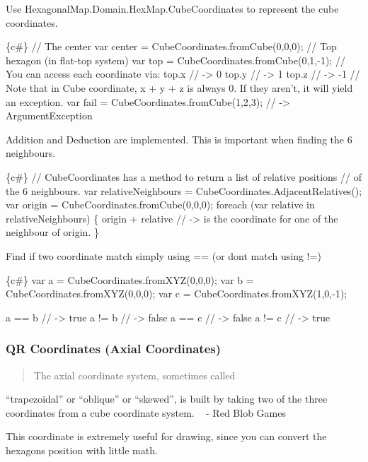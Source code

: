 Use {\ttfamily Hexagonal\+Map.\+Domain.\+Hex\+Map.\+Cube\+Coordinates} to represent the cube coordinates.


\begin{DoxyCode}
\{c#\}
// The center
var center = CubeCoordinates.fromCube(0,0,0);
// Top hexagon (in flat-top system)
var top = CubeCoordinates.fromCube(0,1,-1);
// You can access each coordinate via:
top.x // -> 0
top.y // -> 1
top.z // -> -1
// Note that in Cube coordinate, x + y + z is always 0. If they aren't, it will yield an exception.
var fail = CubeCoordinates.fromCube(1,2,3); // -> ArgumentException
\end{DoxyCode}


Addition and Deduction are implemented. This is important when finding the 6 neighbours.


\begin{DoxyCode}
\{c#\}
// CubeCoordinates has a method to return a list of relative positions
// of the 6 neighbours. 
var relativeNeighbours = CubeCoordinates.AdjacentRelatives();
var origin = CubeCoordinates.fromCube(0,0,0);
foreach (var relative in relativeNeighbours) \{
    origin + relative // -> is the coordinate for one of the neighbour of origin.
\}
\end{DoxyCode}


Find if two coordinate match simply using {\ttfamily ==} (or don\textquotesingle{}t match using {\ttfamily !=})


\begin{DoxyCode}
\{c#\}
var a = CubeCoordinates.fromXYZ(0,0,0);
var b = CubeCoordinates.fromXYZ(0,0,0);
var c = CubeCoordinates.fromXYZ(1,0,-1);

a == b // -> true
a != b // -> false
a == c // -> false
a != c // -> true
\end{DoxyCode}


\subsubsection*{QR Coordinates (Axial Coordinates)}

\begin{quote}
The axial coordinate system, sometimes called \end{quote}
“trapezoidal” or “oblique” or “skewed”, is built by taking two of the three coordinates from a cube coordinate system. ~\newline
-\/ Red Blob Games

This coordinate is extremely useful for drawing, since you can convert the hexagons\textquotesingle{} position with little math.

